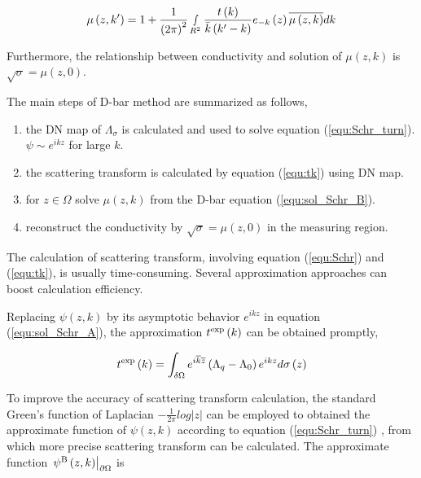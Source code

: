 \begin{equation}\label{equ:sol_Schr_B}
\mu \left( {z,k'} \right) = 1 + \frac{1}{{{{\left( {2\pi } \right)}^2}}}\mathop \smallint \limits_{{R^2}} \frac{{t\left( k \right)}}{{\bar k\left( {k' - k} \right)}}{e_{ - k}}\left( z \right)\overline {\mu \left( {z,k} \right)} dk
\end{equation}

Furthermore, the relationship between conductivity and solution of $\mu \left( {z,k} \right)$ is $\sqrt \sigma   = \mu \left( {z,0} \right)$.

The main steps of D-bar method are summarized as follows,
\begin{enumerate}
  \item the DN map of ${\Lambda _\sigma }$ is calculated and used to solve equation (\ref{equ:Schr_turn}). $\psi \sim {e^{ikz}}$ for large $k$.
  \item the scattering transform is calculated by equation (\ref{equ:tk}) using DN map.
  \item for $z \in \Omega$ solve $\mu (z,k)$ from the D-bar equation (\ref{equ:sol_Schr_B}).
  \item reconstruct the conductivity by $\sqrt \sigma   = \mu \left( {z,0} \right)$ in the measuring region.
\end{enumerate}

The calculation of scattering transform, involving equation (\ref{equ:Schr}) and (\ref{equ:tk}), is usually time-consuming. Several approximation approaches can boost calculation efficiency.

Replacing $\psi \left( {z,k} \right)$ by its asymptotic behavior ${e^{ikz}}$ in equation (\ref{equ:sol_Schr_A})\cite{1966SPhD101033F}, the approximation ${t^{{\rm{exp}}}}\left( k \right)$ can be obtained promptly,

\begin{equation}\label{equ:t_exp}
{t^{{\rm{exp}}}}\left( k \right) = \int_{\delta \Omega } {{e^{i\overline k \overline z }}\left( {{\Lambda _q} - {\Lambda _0}} \right){e^{ikz}}d\sigma \left( z \right)}
\end{equation}

To improve the accuracy of scattering transform calculation, the standard Green’s function of Laplacian $ - \frac{1}{{2\pi }}log\left| z \right|$ can be employed to obtained the approximate function of $\psi \left( {z,k} \right)$ according to equation (\ref{equ:Schr_turn}) \cite{Siltanen2000An}, from which more precise scattering transform can be calculated\cite{Mueller2003DIRECT}. The approximate function ${\left. {{\psi ^{\rm{B}}}\left( {z,k} \right)} \right|_{\partial \Omega }}$ is

